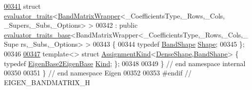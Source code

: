 \begin{DoxyCode}
\hyperlink{struct_eigen_1_1internal_1_1evaluator__traits_3_01_band_matrix_wrapper_3_01___coefficients_type_cee9d317520cda5230220118c896281a}{00341} \textcolor{keyword}{struct }\hyperlink{struct_eigen_1_1internal_1_1evaluator__traits}{evaluator\_traits}<\hyperlink{class_eigen_1_1internal_1_1_band_matrix_wrapper}{BandMatrixWrapper}<\_CoefficientsType,\_Rows,\_Cols,
      \_Supers,\_Subs,\_Options> >
00342   : \textcolor{keyword}{public} \hyperlink{struct_eigen_1_1internal_1_1evaluator__traits__base}{evaluator\_traits\_base}<BandMatrixWrapper<\_CoefficientsType,\_Rows,\_Cols,\_Supe
      rs,\_Subs,\_Options> >
00343 \{
00344   \textcolor{keyword}{typedef} \hyperlink{struct_eigen_1_1internal_1_1_band_shape}{BandShape} \hyperlink{struct_eigen_1_1internal_1_1_band_shape}{Shape};
00345 \};
00346 
\hyperlink{struct_eigen_1_1internal_1_1_assignment_kind_3_01_dense_shape_00_01_band_shape_01_4}{00347} \textcolor{keyword}{template}<> \textcolor{keyword}{struct }\hyperlink{struct_eigen_1_1internal_1_1_assignment_kind}{AssignmentKind}<\hyperlink{struct_eigen_1_1_dense_shape}{DenseShape},\hyperlink{struct_eigen_1_1internal_1_1_band_shape}{BandShape}> \{ \textcolor{keyword}{typedef} 
      \hyperlink{struct_eigen_1_1internal_1_1_eigen_base2_eigen_base}{EigenBase2EigenBase} \hyperlink{struct_eigen_1_1internal_1_1_eigen_base2_eigen_base}{Kind}; \};
00348 
00349 \} \textcolor{comment}{// end namespace internal}
00350 
00351 \} \textcolor{comment}{// end namespace Eigen}
00352 
00353 \textcolor{preprocessor}{#endif // EIGEN\_BANDMATRIX\_H}
\end{DoxyCode}
